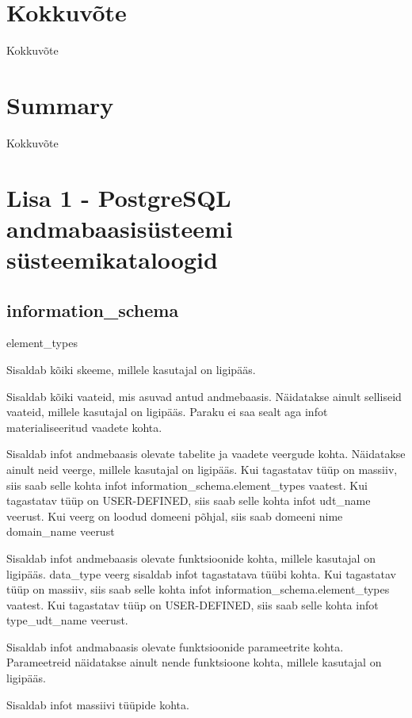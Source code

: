 \documentclass[a4paper,12pt]{article} %
\begin{document}
\section{Kokkuvõte}
Kokkuvõte

\pagebreak

\section{Summary}
Kokkuvõte

\pagebreak




\pagebreak

\section*{Lisa 1 - PostgreSQL andmabaasisüsteemi süsteemikataloogid}
\label{lisa1}
\subsection{information\_schema}
\begin{labeling}{element\_types}
\item [schemata] Sisaldab kõiki skeeme, millele kasutajal on ligipääs.
\item [views] Sisaldab kõiki vaateid, mis asuvad antud andmebaasis. Näidatakse ainult selliseid vaateid, millele kasutajal on ligipääs. Paraku ei saa sealt aga infot materialiseeritud vaadete kohta.
\item [columns] Sisaldab infot andmebaasis olevate tabelite ja vaadete veergude kohta. Näidatakse ainult neid veerge, millele kasutajal on ligipääs. Kui tagastatav tüüp on massiiv, siis saab selle kohta infot information\_schema.element\_types vaatest. Kui tagastatav tüüp on USER-DEFINED, siis saab selle kohta infot udt\_name veerust. Kui veerg on loodud domeeni põhjal, siis saab domeeni nime domain\_name veerust
\item [routines] Sisaldab infot andmebaasis olevate funktsioonide kohta, millele kasutajal on ligipääs. data\_type veerg sisaldab infot tagastatava tüübi kohta. Kui tagastatav tüüp on massiiv, siis saab selle kohta infot information\_schema.element\_types vaatest. Kui tagastatav tüüp on USER-DEFINED, siis saab selle kohta infot type\_udt\_name veerust.
\item [parameters] Sisaldab infot andmabaasis olevate funktsioonide parameetrite kohta. Parameetreid näidatakse ainult nende funktsioone kohta, millele kasutajal on ligipääs.
\item [element\_types] Sisaldab infot massiivi tüüpide kohta.
\end{labeling}
\cite{PostgreSQLInformationSchema}
\end{document}
